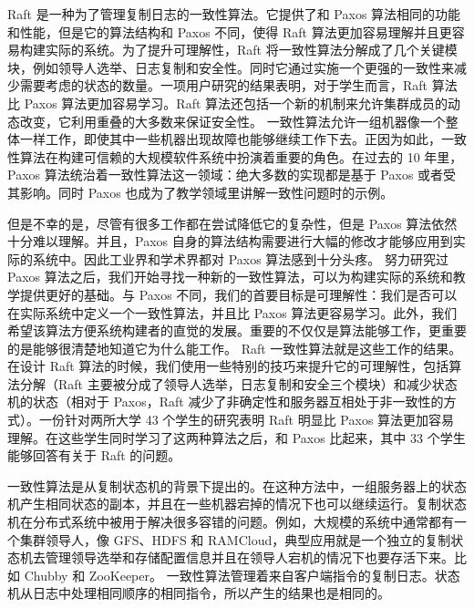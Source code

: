 % 	


Raft 是一种为了管理复制日志的一致性算法。它提供了和 Paxos 算法相同的功能和性能，但是它的算法结构和 Paxos 不同，使得 Raft 算法更加容易理解并且更容易构建实际的系统。为了提升可理解性，Raft 将一致性算法分解成了几个关键模块，例如领导人选举、日志复制和安全性。同时它通过实施一个更强的一致性来减少需要考虑的状态的数量。一项用户研究的结果表明，对于学生而言，Raft 算法比 Paxos 算法更加容易学习。Raft 算法还包括一个新的机制来允许集群成员的动态改变，它利用重叠的大多数来保证安全性。
一致性算法允许一组机器像一个整体一样工作，即使其中一些机器出现故障也能够继续工作下去。正因为如此，一致性算法在构建可信赖的大规模软件系统中扮演着重要的角色。在过去的 10 年里，Paxos 算法统治着一致性算法这一领域：绝大多数的实现都是基于 Paxos 或者受其影响。同时 Paxos 也成为了教学领域里讲解一致性问题时的示例。

但是不幸的是，尽管有很多工作都在尝试降低它的复杂性，但是 Paxos 算法依然十分难以理解。并且，Paxos 自身的算法结构需要进行大幅的修改才能够应用到实际的系统中。因此工业界和学术界都对 Paxos 算法感到十分头疼。
努力研究过 Paxos 算法之后，我们开始寻找一种新的一致性算法，可以为构建实际的系统和教学提供更好的基础。与 Paxos 不同，我们的首要目标是可理解性：我们是否可以在实际系统中定义一个一致性算法，并且比 Paxos 算法更容易学习。此外，我们希望该算法方便系统构建者的直觉的发展。重要的不仅仅是算法能够工作，更重要的是能够很清楚地知道它为什么能工作。
Raft 一致性算法就是这些工作的结果。在设计 Raft 算法的时候，我们使用一些特别的技巧来提升它的可理解性，包括算法分解（Raft 主要被分成了领导人选举，日志复制和安全三个模块）和减少状态机的状态（相对于 Paxos，Raft 减少了非确定性和服务器互相处于非一致性的方式）。一份针对两所大学 43 个学生的研究表明 Raft 明显比 Paxos 算法更加容易理解。在这些学生同时学习了这两种算法之后，和 Paxos 比起来，其中 33 个学生能够回答有关于 Raft 的问题。

一致性算法是从复制状态机的背景下提出的。在这种方法中，一组服务器上的状态机产生相同状态的副本，并且在一些机器宕掉的情况下也可以继续运行。复制状态机在分布式系统中被用于解决很多容错的问题。例如，大规模的系统中通常都有一个集群领导人，像 GFS、HDFS 和 RAMCloud，典型应用就是一个独立的复制状态机去管理领导选举和存储配置信息并且在领导人宕机的情况下也要存活下来。比如 Chubby 和 ZooKeeper。
一致性算法管理着来自客户端指令的复制日志。状态机从日志中处理相同顺序的相同指令，所以产生的结果也是相同的。

